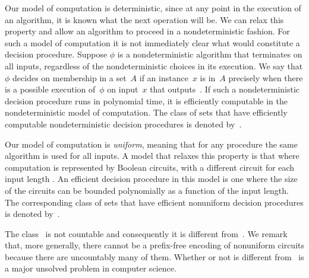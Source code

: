 Our model of computation is deterministic, since at any point in the execution of an algorithm, it is known what the next operation will be.
We can relax this property and allow an algorithm to proceed in a nondeterministic fashion.
For such a model of computation it is not immediately clear what would constitute a decision procedure.
Suppose $\phi$ is a nondeterministic algorithm that terminates on all inputs, regardless of the nondeterministic choices in its execution.
We say that $\phi$ decides on membership in a set~$A$ if an instance~$x$ is in~$A$ precisely when there is a possible execution of~$\phi$ on input~$x$ that outputs~.
If such a nondeterministic decision procedure runs in polynomial time, it is efficiently computable in the nondeterministic model of computation.
The class of sets that have efficiently computable nondeterministic decision procedures is denoted by~.

Our model of computation is \emph{uniform}, meaning that for any procedure the same algorithm is used for all inputs.
A model that relaxes this property is that where computation is represented by Boolean circuits, with a different circuit for each input length \parencite[see][]{arora2009computational,goldreich2008computational}.
An efficient decision procedure in this model is one where the size of the circuits can be bounded polynomially as a function of the input length.
The corresponding class of sets that have efficient nonuniform decision procedures is denoted by~.

The class~ is not countable and consequently it is different from~.
We remark that, more generally, there cannot be a prefix-free encoding of nonuniform circuits because there are uncountably many of them.
Whether or not  is different from~ is a major unsolved problem in computer science.

